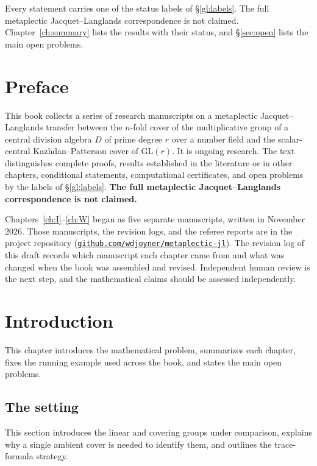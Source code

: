 \documentclass[12pt,letterpaper,oneside]{book}
\theoremstyle{plain}
\theoremstyle{definition}
\begin{document}
Every statement carries one of the status labels of \S\ref{gl:labels}.
The full metaplectic Jacquet--Langlands correspondence is not claimed.
Chapter~\ref{ch:summary} lists the results with their status, and
\S\ref{sec:open} lists the main open problems.

\chapter{Preface}
This book collects a series of research manuscripts on a metaplectic
Jacquet--Langlands transfer between the $n$-fold cover of the
multiplicative group of a central division algebra $D$ of prime degree
$r$ over a number field and the scalar-central Kazhdan--Patterson cover
of $\mathrm{GL}(r)$. It is ongoing research. The text distinguishes
complete proofs, results established in the literature or in other
chapters, conditional statements, computational certificates, and open
problems by the labels of \S\ref{gl:labels}. \textbf{The full metaplectic
Jacquet--Langlands correspondence is not claimed.}

Chapters~\ref{ch:I}--\ref{ch:W} began as five separate manuscripts,
written in November 2026. Those manuscripts, the revision logs, and the
referee reports are in the project repository
(\href{https://github.com/wdjoyner/metaplectic-jl}{\nolinkurl{github.com/wdjoyner/metaplectic-jl}}).
The revision log of this draft records which manuscript each chapter
came from and what was changed when the book was assembled and revised.
Independent human review is the next step, and the mathematical claims
should be assessed independently.

\mainmatter
\chapter{Introduction}\label{ch:intro}
This chapter introduces the mathematical problem, summarizes each chapter, fixes the running example used across the book, and states the main open problems.

\section{The setting}\label{sec:setting}
This section introduces the linear and covering groups under comparison, explains why a single ambient cover is needed to identify them, and outlines the trace-formula strategy.
\end{document}
